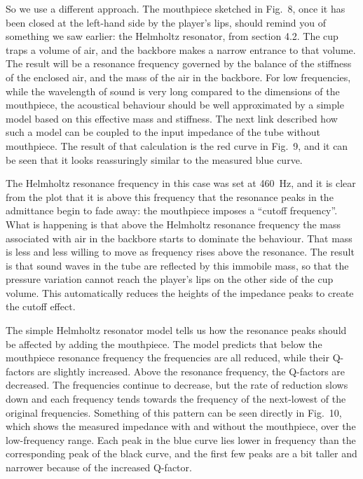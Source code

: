   So we use a different approach. The mouthpiece sketched in Fig.\ 8, once it 
  has been closed at the left-hand side by the player’s lips, should remind you 
  of something we saw earlier: the Helmholtz resonator, from section 4.2. The 
  cup traps a volume of air, and the backbore makes a narrow entrance to that 
  volume. The result will be a resonance frequency governed by the balance of 
  the stiffness of the enclosed air, and the mass of the air in the backbore. 
  For low frequencies, while the wavelength of sound is very long compared to 
  the dimensions of the mouthpiece, the acoustical behaviour should be well 
  approximated by a simple model based on this effective mass and stiffness. 
  The next link described how such a model can be coupled to the input 
  impedance of the tube without mouthpiece. The result of that calculation is 
  the red curve in Fig.\ 9, and it can be seen that it looks reassuringly 
  similar to the measured blue curve. 

  The Helmholtz resonance frequency in this case was set at 460~Hz, and it is 
  clear from the plot that it is above this frequency that the resonance peaks 
  in the admittance begin to fade away: the mouthpiece imposes a “cutoff 
  frequency”. What is happening is that above the Helmholtz resonance frequency 
  the mass associated with air in the backbore starts to dominate the 
  behaviour. That mass is less and less willing to move as frequency rises 
  above the resonance. The result is that sound waves in the tube are reflected 
  by this immobile mass, so that the pressure variation cannot reach the 
  player’s lips on the other side of the cup volume. This automatically reduces 
  the heights of the impedance peaks to create the cutoff effect. 

  The simple Helmholtz resonator model tells us how the resonance peaks should 
  be affected by adding the mouthpiece. The model predicts that below the 
  mouthpiece resonance frequency the frequencies are all reduced, while their 
  Q-factors are slightly increased. Above the resonance frequency, the 
  Q-factors are decreased. The frequencies continue to decrease, but the rate 
  of reduction slows down and each frequency tends towards the frequency of the 
  next-lowest of the original frequencies. Something of this pattern can be 
  seen directly in Fig.\ 10, which shows the measured impedance with and 
  without the mouthpiece, over the low-frequency range. Each peak in the blue 
  curve lies lower in frequency than the corresponding peak of the black curve, 
  and the first few peaks are a bit taller and narrower because of the 
  increased Q-factor. 

